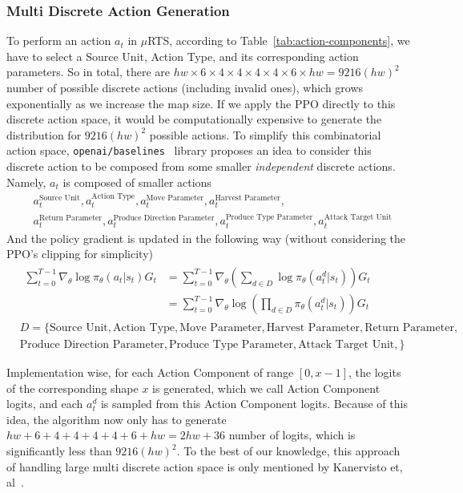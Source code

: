 \documentclass[letterpaper]{article}
\begin{document}
\subsubsection{Multi Discrete Action Generation}
To perform an action $a_t$ in $\mu$RTS, according to Table~\ref{tab:action-components}, we have to select a Source Unit, Action Type, and its corresponding action parameters. So in total, there are $hw\times6\times4\times4\times4\times4\times6\times hw = 9216(hw)^2 $  number of possible discrete actions (including invalid ones), which grows exponentially as we increase the map size. If we apply the PPO directly to this discrete action space, it would be computationally expensive to generate the distribution for $9216(hw)^2 $ possible actions. To simplify this combinatorial action space, \texttt{openai/baselines}~\cite{baselines} library proposes an idea to consider this discrete action to be composed from some smaller \emph{independent} discrete actions. Namely, $a_t$ is composed of smaller actions
\begin{align*}
    &a_{t}^{\text{Source Unit}},a_{t}^{\text{Action Type}},a_{t}^{\text{Move Parameter}},a_{t}^{\text{Harvest Parameter}}, \\
    &a_{t}^{\text{Return Parameter}},a_{t}^{\text{Produce Direction Parameter}}, a_{t}^{\text{Produce Type Parameter}},a_{t}^{\text{Attack Target Unit}}
\end{align*}
And the policy gradient is updated in the following way (without considering the PPO's clipping for simplicity)
\begin{align*}
     &\begin{aligned}
         \sum_{t=0}^{T-1}\nabla_{\theta}\log\pi_{\theta}(a_t|s_t)G_t  &= \sum_{t=0}^{T-1}\nabla_{\theta}  \left( \sum_{d\in D} \log\pi_{\theta}(a^{d}_{t}|s_t) \right)G_t\\
         &= \sum_{t=0}^{T-1}\nabla_{\theta}  \log \left( \prod_{d\in D} \pi_{\theta}(a^{d}_{t}|s_t) \right)G_t
     \end{aligned} \\
     &D = \{\text{Source Unit},\text{Action Type},\text{Move Parameter},\text{Harvest Parameter},\text{Return Parameter},\\
     &\text{Produce Direction Parameter},\text{Produce Type Parameter},\text{Attack Target Unit},\}
\end{align*}

Implementation wise, for each Action Component of range $[0, x-1]$, the logits of the corresponding shape $x$ is generated, which we call Action Component logits, and each $a^{d}_{t}$ is sampled from this Action Component logits. Because of this idea, the algorithm now only has to generate $hw+6+4+4+4+4+6+hw = 2hw + 36$ number of logits, which is significantly less than $9216(hw)^2$. To the best of our knowledge, this approach of handling large multi discrete action space is only mentioned by Kanervisto et, al~\cite{kanervisto2020action}.
\end{document}
